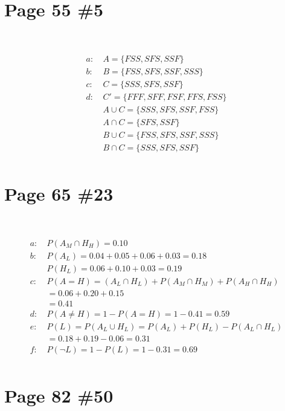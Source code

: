 \documentclass{article}
\begin{document}
\section*{Page 55 \#5}

~

\begin{align*}
    a:\ &A=\{FSS,SFS,SSF\}\\
    b:\ &B=\{FSS,SFS,SSF,SSS\}\\
    c:\ &C=\{SSS,SFS,SSF\}\\
    d:\ &C'=\{FFF,SFF,FSF,FFS,FSS\}\\
    &A\cup C=\{SSS,SFS,SSF,FSS\}\\
    &A\cap C=\{SFS,SSF\}\\
    &B\cup C=\{FSS,SFS,SSF,SSS\}\\
    &B\cap C=\{SSS,SFS,SSF\}\\
\end{align*}

\newpage

\section*{Page 65 \#23}

~

\begin{align*}
    a:\ &P(A_M\cap H_H)=0.10\\
    b:\ &P(A_L)=0.04+0.05+0.06+0.03=0.18\\
    &P(H_L)=0.06+0.10+0.03=0.19\\
    c:\ &P(A=H)=(A_L\cap H_L)+P(A_M\cap H_M)+P(A_H\cap H_H)\\
    &=0.06+0.20+0.15\\
    &=0.41\\
    d:\ &P(A\ne H)=1-P(A=H)=1-0.41=0.59\\
    e:\ &P(L)=P(A_L\cup H_L)=P(A_L)+P(H_L)-P(A_L\cap H_L)\\
    &=0.18+0.19-0.06=0.31\\
    f:\ &P(\neg L)=1-P(L)=1-0.31=0.69\\
\end{align*}

\newpage

\section*{Page 82 \#50}

~
\end{document}

